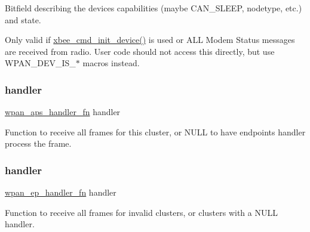 Bitfield describing the device\textquotesingle{}s capabilities (maybe C\+A\+N\+\_\+\+S\+L\+E\+EP, nodetype, etc.) and state. 

Only valid if \hyperlink{group__xbee__atcmd_ga1cc803f821ed44e27e404d38349f53c7}{xbee\+\_\+cmd\+\_\+init\+\_\+device()} is used or A\+LL Modem Status messages are received from radio. User code should not access this directly, but use W\+P\+A\+N\+\_\+\+D\+E\+V\+\_\+\+I\+S\+\_\+$\ast$ macros instead. \mbox{\label{group__wpan__aps_gab0c5e32241c4c2860c728aeab4b6f253}} 
\subsubsection{\texorpdfstring{handler}{handler}\hspace{0.1cm}{\footnotesize\ttfamily [1/2]}}
{\footnotesize\ttfamily \hyperlink{group__wpan__aps_ga8575b0db762a5fbb858d4994c9b657e3}{wpan\+\_\+aps\+\_\+handler\+\_\+fn} handler}



Function to receive all frames for this cluster, or N\+U\+LL to have endpoint\textquotesingle{}s handler process the frame. 

\mbox{\label{group__wpan__aps_ga4835da0b636ce07eedbf92aa2779a761}} 
\subsubsection{\texorpdfstring{handler}{handler}\hspace{0.1cm}{\footnotesize\ttfamily [2/2]}}
{\footnotesize\ttfamily \hyperlink{group__wpan__aps_ga23d4e0e2f2137c75700dfec73b2cc80f}{wpan\+\_\+ep\+\_\+handler\+\_\+fn} handler}



Function to receive all frames for invalid clusters, or clusters with a {\ttfamily N\+U\+LL} handler. 

\mbox{\label{group__wpan__aps_ga5ca7f19e5697de2baf0e2147a41a5792}} 
